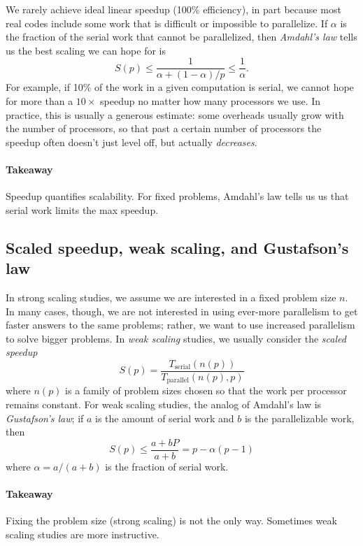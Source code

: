 \documentclass[12pt, leqno]{article} %
\begin{document}
We rarely achieve ideal linear speedup (100\% efficiency), in part
because most real codes include some work that is difficult or
impossible to parallelize. If $\alpha$ is the fraction of the serial
work that cannot be parallelized, then \emph{Amdahl's law} tells us the
best scaling we can hope for is
\[
  S(p) \leq \frac{1}{\alpha+(1-\alpha)/p} \leq \frac{1}{\alpha}.
\]
For example, if 10\% of the work in a given computation is serial, we
cannot hope for more than a $10 \times$ speedup no matter how many
processors we use. In practice, this is usually a generous estimate:
some overheads usually grow with the number of processors, so that past
a certain number of processors the speedup often doesn't just level off,
but actually \emph{decreases}.

\paragraph{Takeaway}

Speedup quantifies scalability. For fixed problems, Amdahl's law tells
us us that serial work limits the max speedup.

\subsection{Scaled speedup, weak scaling, and Gustafson's law}

In strong scaling studies, we assume we are interested in a fixed
problem size $n$. In many cases, though, we are not interested in using
ever-more parallelism to get faster answers to the same problems;
rather, we want to use increased parallelism to solve bigger problems.
In \emph{weak scaling} studies, we usually consider the \emph{scaled
speedup}
\[
S(p) = \frac{T_{\mathrm{serial}}(n(p))}
            {T_{\mathrm{parallel}}(n(p),p)}
\]
where $n(p)$ is a family of problem sizes chosen so that the work per
processor remains constant. For weak scaling studies, the analog of
Amdahl's law is \emph{Gustafson's law}; if $a$ is the amount of serial
work and $b$ is the parallelizable work, then
\[
  S(p) \leq \frac{a + bP}{a + b} = p-\alpha(p-1)
\]
where $\alpha = a/(a+b)$ is the fraction of serial work.

\paragraph{Takeaway}

Fixing the problem size (strong scaling) is not the only way. Sometimes
weak scaling studies are more instructive.
\end{document}
